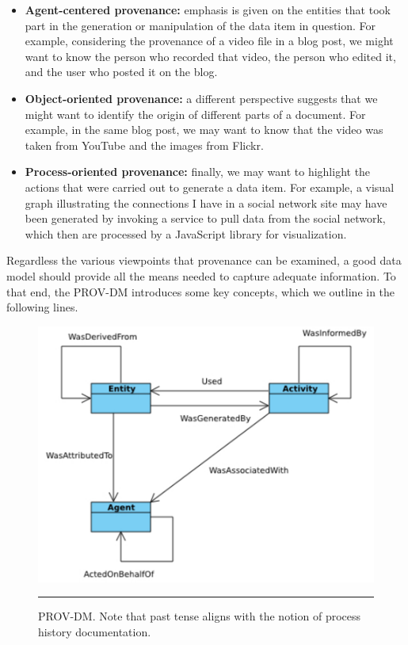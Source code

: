 \begin{itemize}
  \item
        \textbf{Agent-centered provenance:} emphasis is given on the entities that took part in the generation or manipulation of the data item in question. For example, considering the provenance of a video file in a blog post, we might want to know the person who recorded that video, the person who edited it, and the user who posted it on the blog.
  \item
        \textbf{Object-oriented provenance:} a different perspective suggests that we might want to identify the origin of different parts of a document. For example, in the same blog post, we may want to know that the video was taken from YouTube and the images from Flickr.
  \item \textbf{Process-oriented provenance:} finally, we may want to highlight the actions that were carried out to generate a data item. For example, a visual graph illustrating the connections I have in a social network site may have been generated by invoking a service to pull data from the social network, which then are processed by a JavaScript library for visualization.
\end{itemize}

Regardless the various viewpoints that provenance can be examined, a good data model should provide all the means needed to capture adequate information. To that end, the PROV-DM introduces some key concepts, which we outline in the following lines.

\begin{figure}[htbp]
	\centering
		\includegraphics[scale=0.90]{./Figures/chapter2/figure8.pdf}
		\rule{35em}{0.5pt}
	\caption[PROV-DM]{PROV-DM\cite{reference14}. Note that past tense aligns with the notion of process history documentation.}
	\label{fig:provDM}
\end{figure}

